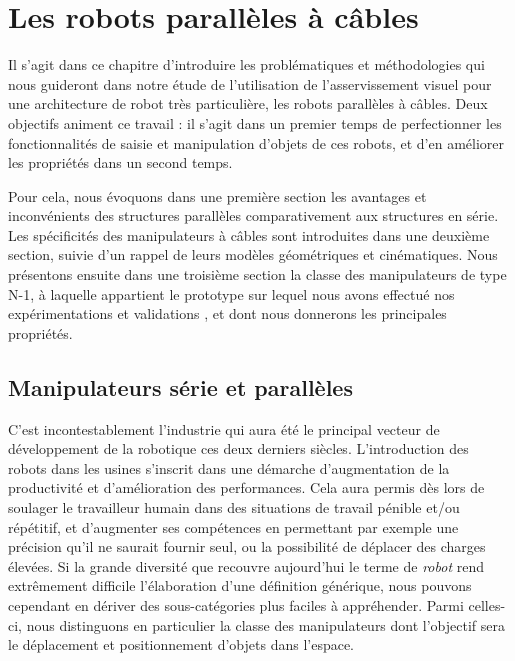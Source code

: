\chapter{Les robots parall\`eles \`a c\^ables} \label{chap0}

Il s'agit dans ce chapitre d'introduire les problématiques et méthodologies qui 
nous guideront dans notre étude de l'utilisation de l'asservissement visuel pour 
une architecture de robot très particulière, les robots parall\`eles \`a 
c\^ables. Deux objectifs animent ce travail : il s'agit dans un premier temps 
de perfectionner les fonctionnalités de saisie et manipulation d'objets de ces 
robots, et d'en améliorer les propriétés dans un second temps.

Pour cela, nous  évoquons dans une première section les avantages et 
inconvénients des structures parallèles comparativement aux structures en série. 
Les spécificités des manipulateurs à c\^ables sont introduites dans une deuxième 
section, suivie d'un rappel de leurs modèles géométriques et cinématiques. 
Nous présentons ensuite dans une troisième section la classe des manipulateurs 
de type N-1, \`a laquelle appartient le prototype sur lequel nous avons 
effectu\'e nos expérimentations et validations , et dont nous donnerons 
les principales propri\'et\'es.


\section{Manipulateurs série et parallèles} \label{chap0-0}

C'est incontestablement l'industrie qui aura été le principal vecteur de 
développe\-ment de la robotique ces deux derniers siècles. L'introduction des 
robots dans les usines s'inscrit dans une démarche d'augmentation de la 
productivité et d'amélio\-ration des performances. Cela aura permis dès lors de 
soulager le travailleur humain dans des situations de travail pénible et/ou 
répétitif, et d'augmenter ses compétences en permettant par exemple une 
précision qu'il ne saurait fournir seul, ou la possibilité de déplacer des 
charges élevées. Si la grande diversité que recouvre aujourd'hui le terme de 
{\it robot} rend extrêmement difficile l'élaboration d'une définition générique, 
nous pouvons cependant en dériver des sous-catégories plus faciles à 
appréhender. Parmi celles-ci, nous distinguons en particulier la classe des 
manipulateurs dont l'objectif sera le déplacement et positionnement d'objets 
dans l'espace.

